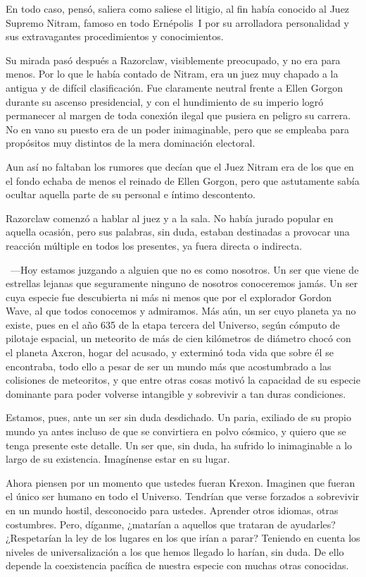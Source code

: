 En todo caso, pensó, saliera como saliese el litigio, al fin había conocido al Juez Supremo Nitram, famoso en todo Ernépolis~I por su arrolladora personalidad y sus extravagantes procedimientos y conocimientos.

Su mirada pasó después a Razorclaw, visiblemente preocupado, y no era para menos. Por lo que le había contado de Nitram, era un juez muy chapado a la antigua y de difícil clasificación. Fue claramente neutral frente a Ellen Gorgon durante su ascenso presidencial, y con el hundimiento de su imperio logró permanecer al margen de toda conexión ilegal que pusiera en peligro su carrera. No en vano su puesto era de un poder inimaginable, pero que se empleaba para propósitos muy distintos de la mera dominación electoral.

Aun así no faltaban los rumores que decían que el Juez Nitram era de los que en el fondo echaba de menos el reinado de Ellen Gorgon, pero que astutamente sabía ocultar aquella parte de su personal e íntimo descontento.

Razorclaw comenzó a hablar al juez y a la sala. No había jurado popular en aquella ocasión, pero sus palabras, sin duda, estaban destinadas a provocar una reacción múltiple en todos los presentes, ya fuera directa o indirecta.

~---Hoy estamos juzgando a alguien que no es como nosotros. Un ser que viene de estrellas lejanas que seguramente ninguno de nosotros conoceremos jamás. Un ser cuya especie fue descubierta ni más ni menos que por el explorador Gordon Wave, al que todos conocemos y admiramos. Más aún, un ser cuyo planeta ya no existe, pues en el año 635 de la etapa tercera del Universo, según cómputo de pilotaje espacial, un meteorito de más de cien kilómetros de diámetro chocó con el planeta Axcron, hogar del acusado, y exterminó toda vida que sobre él se encontraba, todo ello a pesar de ser un mundo más que acostumbrado a las colisiones de meteoritos, y que entre otras cosas motivó la capacidad de su especie dominante para poder volverse intangible y sobrevivir a tan duras condiciones.

\rquoti Estamos, pues, ante un ser sin duda desdichado. Un paria, exiliado de su propio mundo ya antes incluso de que se convirtiera en polvo cósmico, y quiero que se tenga presente este detalle. Un ser que, sin duda, ha sufrido lo inimaginable a lo largo de su existencia. Imagínense estar en su lugar.

\rquoti Ahora piensen por un momento que ustedes fueran Krexon. Imaginen que fueran el único ser humano en todo el Universo. Tendrían que verse forzados a sobrevivir en un mundo hostil, desconocido para ustedes. Aprender otros idiomas, otras costumbres. Pero, díganme, ¿matarían a aquellos que trataran de ayudarles? ¿Respetarían la ley de los lugares en los que irían a parar? Teniendo en cuenta los niveles de universalización a los que hemos llegado lo harían, sin duda. De ello depende la coexistencia pacífica de nuestra especie con muchas otras conocidas.

